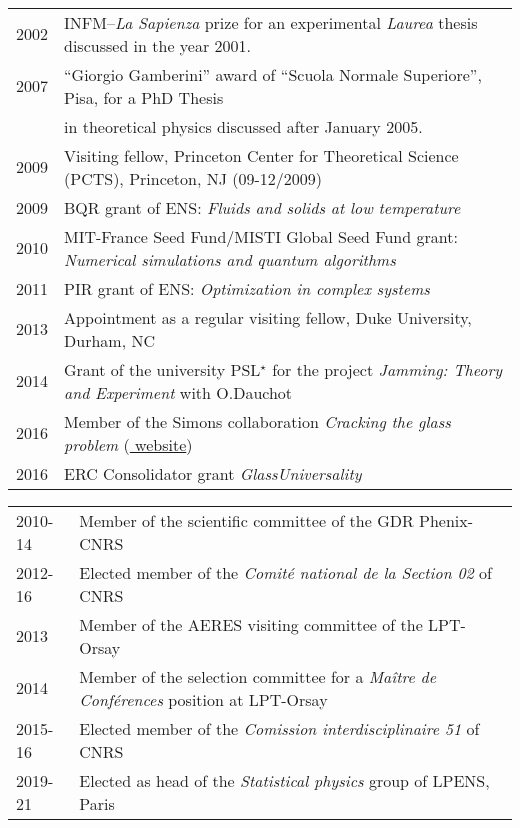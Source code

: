 \documentclass[a4paper,10pt]{article}
\begin{document}
 \\
\begin{table}[h]
\begin{tabular}{ll}
2002 & INFM--{\it La Sapienza} prize 
for an experimental {\it Laurea} thesis discussed in the year 2001.\\
2007 & ``Giorgio Gamberini'' award of ``Scuola Normale Superiore'', Pisa, for a PhD Thesis \\
 & in theoretical physics discussed after January 2005. \\
2009 & Visiting fellow, Princeton Center for Theoretical Science (PCTS), Princeton, NJ
(09-12/2009) \\
2009 & BQR grant of ENS: {\it Fluids and solids at low temperature} \\
2010 & MIT-France Seed Fund/MISTI Global Seed Fund grant: {\it Numerical simulations and quantum
algorithms} \\
2011 & PIR grant of ENS: {\it Optimization in complex systems} \\
2013 & Appointment as a regular visiting fellow, Duke University, Durham, NC \\
2014 & Grant of the university PSL$^\star$ for the project {\it Jamming: Theory and Experiment} with O.Dauchot \\ 
2016 & Member of the Simons collaboration {\it Cracking the glass problem} (\href{http://scglass.uchicago.edu}{{\color{blue} website}})  \\
2016 & ERC Consolidator grant {\it GlassUniversality} \\
\end{tabular}
\end{table}




\newpage


\begin{table}[h]
\begin{tabular}{ll}
2010-14 & Member of the scientific committee of the GDR Phenix-CNRS \\
2012-16 & Elected member of the {\it Comit\'e national de la Section 02} of CNRS \\
2013 & Member of the AERES visiting committee of the LPT-Orsay \\
2014 & Member of the selection committee for a {\it Ma\^itre de Conf\'erences} position at LPT-Orsay \\
2015-16 & Elected member of the {\it Comission interdisciplinaire 51} of CNRS \\
2019-21 & Elected as head of the {\it Statistical physics} group of LPENS, Paris \\
\end{tabular}
\end{table}
\end{document}
